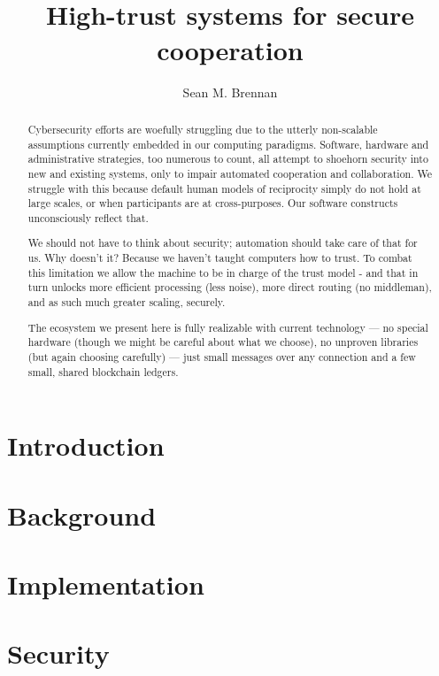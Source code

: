 \documentclass[10pt,twoside]{article}
\title{\textbf{\huge \projectName}\\ High-trust systems for secure cooperation}
\author{Sean M. Brennan}
\date{\monthname{} \the\year}
\begin{document}
	
\TekFiveTitle

\begin{abstract}
	Cybersecurity efforts are woefully struggling due to the utterly non-scalable assumptions currently embedded in our computing paradigms.
	Software, hardware and administrative strategies, too numerous to count, all attempt to shoehorn security into new and existing systems, only to impair automated cooperation and collaboration.
	We struggle with this because default human models of reciprocity simply do not hold at large scales, or when participants are at cross-purposes.
	Our software constructs unconsciously reflect that.
	
	We should not have to think about security; automation should take care of that for us.
	Why doesn't it?
	Because we haven't taught computers how to trust.
	To combat this limitation we allow the machine to be in charge of the trust model - and that in turn unlocks more efficient processing (less noise), more direct routing (no middleman), and as such much greater scaling, securely.
		
	The ecosystem we present here is fully realizable with current technology --- no special hardware (though we might be careful about what we choose), no unproven libraries (but again choosing carefully) --- just small messages over any connection and a few small, shared blockchain ledgers.
\end{abstract}

\show\SCENARIO

\section{Introduction}\label{sec:intro}


\section{Background}\label{sec:background}


\section{Implementation}\label{sec:implementation}


\section{Security}\label{sec:vectors}

\end{document}
